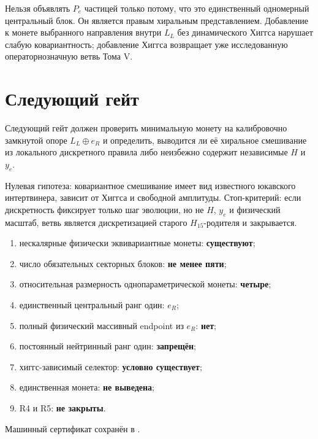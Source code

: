 \begin{nogocriterion}
Нельзя объявлять $P_e$ частицей только потому, что это единственный
одномерный центральный блок. Он является правым хиральным представлением.
Добавление к монете выбранного направления внутри $L_L$ без динамического
Хиггса нарушает слабую ковариантность; добавление Хиггса возвращает уже
исследованную операторнозначную ветвь Тома V.
\end{nogocriterion}

\section{Следующий гейт}

Следующий гейт
должен проверить минимальную монету на калибровочно замкнутой опоре
$L_L\oplus e_R$ и определить, выводится ли её хиральное смешивание из
локального дискретного правила либо неизбежно содержит независимые $H$ и
$y_e$.

Нулевая гипотеза: ковариантное смешивание имеет вид известного юкавского
интертвинера, зависит от Хиггса и свободной амплитуды. Стоп-критерий: если
дискретность фиксирует только шаг эволюции, но не $H$, $y_e$ и физический
масштаб, ветвь является дискретизацией старого $H_{15}$-родителя и закрывается.

\begin{protocol}
\begin{enumerate}
 \item нескалярные физически эквивариантные монеты: \textbf{существуют};
 \item число обязательных секторных блоков: \textbf{не менее пяти};
 \item относительная размерность однопараметрической монеты:
 \textbf{четыре};
 \item единственный центральный ранг один: \textbf{$e_R$};
 \item полный физический массивный endpoint из $e_R$: \textbf{нет};
 \item постоянный нейтринный ранг один: \textbf{запрещён};
 \item хиггс-зависимый селектор: \textbf{условно существует};
 \item единственная монета: \textbf{не выведена};
 \item R4 и R5: \textbf{не закрыты}.
\end{enumerate}
\end{protocol}

Машинный сертификат сохранён в
.